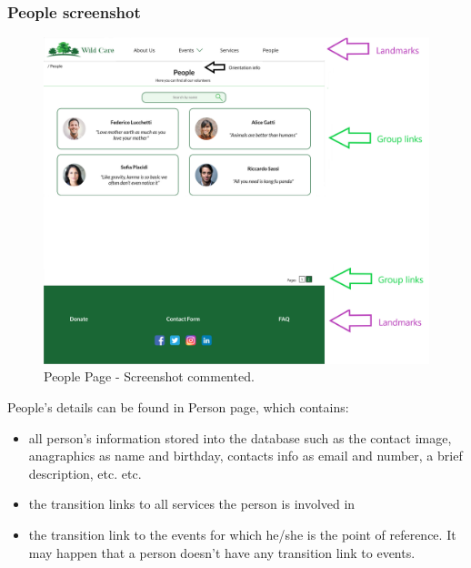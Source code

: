 \subsubsection{People screenshot}
\begin{figure}[h!]
	\centering
	\begin{minipage}[b]{1\textwidth}
    		\includegraphics[width=\textwidth]{./assets/mockups/people_commented.png}
		\caption{People Page - Screenshot commented.}
	\end{minipage}
\end{figure}
\FloatBarrier

\vspace{1cm}
\hspace{-1cm}
People's details can be found in Person page, which contains:
\begin{itemize}
	\item all person's information stored into the database such as the contact image, anagraphics as name and birthday, contacts 			info as email and number,	a brief description, etc. etc.
	\item the transition links to all services the person is involved in
	\item the transition link to the events for which he/she is the point of reference. It may happen that a person doesn't have any 		transition link to events.
\end{itemize} 

\clearpage

